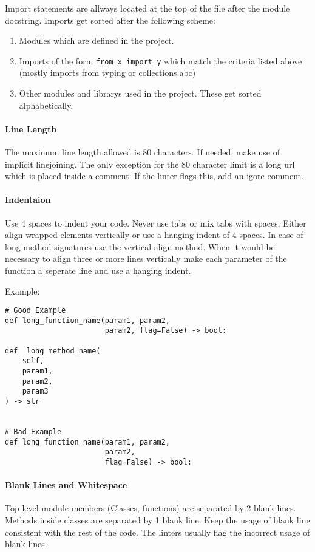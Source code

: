 Import statements are allways located at the top of the file after the module
docstring. Imports get sorted after the following scheme:

\begin{enumerate}
    \item Modules which are defined in the project. 
    \item Imports of the form \texttt{from x import y} which match the criteria
        listed above \\  (mostly imports from typing or collections.abc)
    \item Other modules and librarys used in the project. These get sorted
        alphabetically.
\end{enumerate}

\paragraph{Line Length} The maximum line length allowed is 80 characters. If
needed, make use of implicit linejoining. The only exception for the 80
character limit is a long url which is placed inside a comment. If the linter
flags this, add an igore comment.

\paragraph{Indentaion} Use 4 spaces to indent your code. Never use tabs or
mix tabs with spaces. Either align wrapped elements vertically or use a hanging
indent of 4 spaces. In case of long method signatures use the vertical align
method. When it would be necessary to align three or more lines vertically
make each parameter of the function a seperate line and use a hanging indent.

Example:

\pythonstyle
\begin{lstlisting}[caption={Indentaion Example}]
# Good Example
def long_function_name(param1, param2,
                       param2, flag=False) -> bool:

def _long_method_name(
    self,
    param1,
    param2,
    param3
) -> str


# Bad Example
def long_function_name(param1, param2,
                       param2,
                       flag=False) -> bool:
\end{lstlisting}

\paragraph{Blank Lines and Whitespace} Top level module members
(Classes, functions) are separated by 2 blank lines. Methods inside classes are
separated by 1 blank line. Keep the usage of blank line consistent with the
rest of the code. The linters usually flag the incorrect usage of blank lines.

